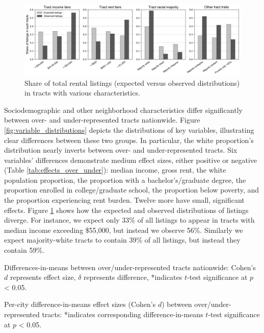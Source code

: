 \documentclass[11pt,letterpaper]{article}
\begin{document}
\begin{figure}[tbp]
	\centering
	\includegraphics[width=1\textwidth]{fig_tract_shares_grouped.png}
	\caption{Share of total rental listings (expected versus observed distributions) in tracts with various characteristics.}
	\label{fig:tract_shares}
\end{figure}

Sociodemographic and other neighborhood characteristics differ significantly between over- and under-represented tracts nationwide. Figure \ref{fig:variable_distributions} depicts the distributions of key variables, illustrating clear differences between these two groups. In particular, the white proportion's distribution nearly inverts between over- and under-represented tracts. Six variables' differences demonstrate medium effect sizes, either positive or negative (Table \ref{tab:effects_over_under}): median income, gross rent, the white population proportion, the proportion with a bachelor's/graduate degree, the proportion enrolled in college/graduate school, the proportion below poverty, and the proportion experiencing rent burden. Twelve more have small, significant effects. Figure \ref{fig:tract_shares} shows how the expected and observed distributions of listings diverge. For instance, we expect only 33\% of all listings to appear in tracts with median income exceeding \$55,000, but instead we observe 56\%. Similarly we expect majority-white tracts to contain 39\% of all listings, but instead they contain 59\%.

\begin{table}[tbp]
	\centering
	\small
	\caption{Differences-in-means between over/under-represented tracts nationwide: Cohen's $d$ represents effect size, $\delta$ represents difference, *indicates $t$-test significance at $p$ < 0.05.}
	\label{tab:effects_over_under}
	
\end{table}

\begin{table}[tbp]
	\centering
	\caption{Per-city difference-in-means effect sizes (Cohen's $d$) between over/under-represented tracts: *indicates corresponding difference-in-means $t$-test significance at $p$ < 0.05.}
	\label{tab:effects_cities}
	
\end{table}
\end{document}
